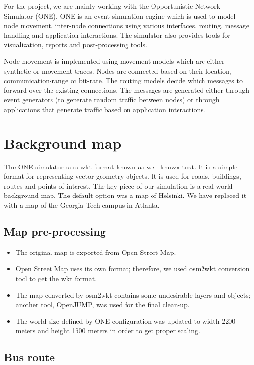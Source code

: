 \documentclass[conference]{IEEEtran}
\begin{document}
For the project, we are mainly working with the Opportunistic Network Simulator (ONE). ONE is an event simulation engine which is used to model node movement, inter-node connections using various interfaces, routing, message handling and application interactions. The simulator also provides tools for visualization, reports and post-processing tools.

Node movement is implemented using movement models which are either synthetic or movement traces. Nodes are connected based on their location, communication-range or bit-rate. The routing models decide which messages to forward over the existing connections. The messages are generated either through event generators (to generate random traffic between nodes) or through applications that generate traffic based on application interactions.

\section{Background map}

The ONE simulator uses wkt format known as well-known text. It is a simple format for representing vector geometry objects. It is used for roads, buildings, routes and points of interest. The key piece of our simulation is a real world background map. The default option was a map of Helsinki. We have replaced it with a map of the Georgia Tech campus in Atlanta.

\subsection{Map pre-processing}

\begin{itemize}
  \item The original map is exported from Open Street Map.
  \item Open Street Map uses its own format; therefore, we used osm2wkt conversion tool to get the wkt format.
  \item The map converted by osm2wkt contains some undesirable layers and objects; another tool, OpenJUMP, was used for the final clean-up.
  \item The world size defined by ONE configuration was updated to width 2200 meters and height 1600 meters in order to get proper scaling.
\end{itemize}

\subsection{Bus route}
\end{document}
